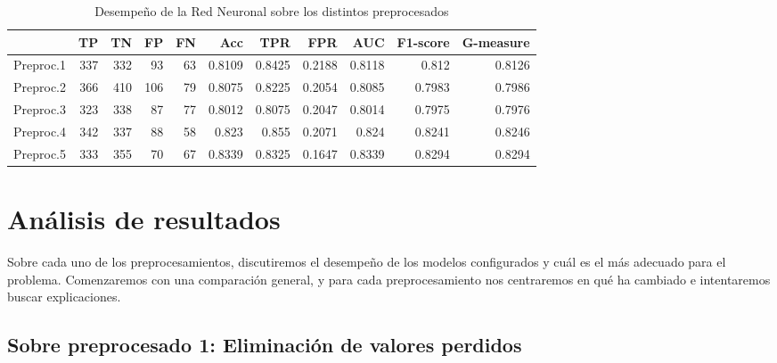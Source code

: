\documentclass{article}
\begin{document}
\begin{table}[H]
\centering
\caption{Desempeño de la Red Neuronal sobre los distintos preprocesados}
\label{tab:mlp}
\begin{tabular}{|lrrrrrrrrrr|}
\hline
 & TP & TN & FP & FN & Acc & TPR & FPR & AUC & F1-score & G-measure\\ \hline
  Preproc.1 & 337 & 332 & 93 & 63 & 0.8109 & 0.8425 & 0.2188 & 0.8118 & 0.812 & 0.8126\\
  Preproc.2 & 366 & 410 & 106 & 79 & 0.8075 & 0.8225 & 0.2054 & 0.8085 & 0.7983 & 0.7986\\
  Preproc.3 & 323 & 338 & 87 & 77 & 0.8012 & 0.8075 & 0.2047 & 0.8014 & 0.7975 & 0.7976\\
  Preproc.4 & 342 & 337 & 88 & 58 & 0.823 & 0.855 & 0.2071 & 0.824 & 0.8241 & 0.8246\\
  Preproc.5 & 333 & 355 & 70 & 67 & 0.8339 & 0.8325 & 0.1647 & 0.8339 & 0.8294 & 0.8294\\
\hline
\end{tabular}
\end{table}

\section{Análisis de resultados} \label{sec:analisis}

Sobre cada uno de los preprocesamientos, discutiremos el desempeño de
los modelos configurados y cuál es el más adecuado para el problema.
Comenzaremos con una comparación general, y para cada preprocesamiento
nos centraremos en qué ha cambiado e intentaremos buscar
explicaciones.

\subsection{Sobre preprocesado 1: Eliminación de valores perdidos}
\end{document}
